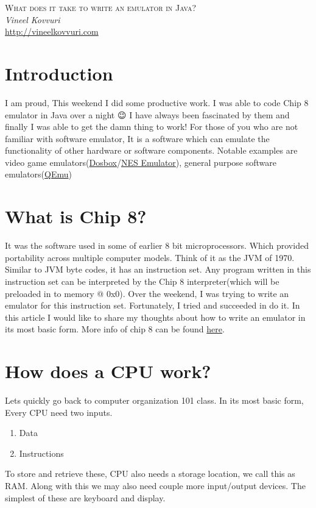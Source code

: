 \documentclass{article}
\begin{document}
\begin{titlepage}
   \begin{center}
      \Large\textsc{What does it take to write an emulator in Java?}\\
      \vspace{5mm}
      \Large\textit{Vineel Kovvuri}\\
      \url{http://vineelkovvuri.com}\\
   \end{center}
\end{titlepage}

\tableofcontents

\newpage
\section{Introduction}
I am proud, This weekend I did some productive work. I was able to code Chip 8 emulator in Java over a night 😉 I have always been fascinated by them and finally I was able to get the damn thing to work! For those of you who are not familiar with software emulator, It is a software which can emulate the functionality of other hardware or software components. Notable examples are video game emulators(\href{https://en.wikipedia.org/wiki/DOSBox}{Dosbox}/\href{https://en.wikipedia.org/wiki/List_of_video_game_emulators}{NES Emulator}), general purpose software emulators(\href{https://en.wikipedia.org/wiki/QEMU}{QEmu})

\section{What is Chip 8?}
It was the software used in some of earlier 8 bit microprocessors. Which provided portability across multiple computer models. Think of it as the JVM of 1970. Similar to JVM byte codes, it has an instruction set. Any program written in this instruction set can be interpreted by the Chip 8 interpreter(which will be preloaded in to memory @ 0x0). Over the weekend, I was trying to write an emulator for this instruction set. Fortunately, I tried and succeeded in do it. In this article I would like to share my thoughts about how to write an emulator in its most basic form. More info of chip 8 can be found \href{https://en.wikipedia.org/wiki/CHIP-8}{here}.

\section{How does a CPU work?}
Lets quickly go back to computer organization 101 class. In its most basic form, Every CPU need two inputs.
\begin{enumerate}[noitemsep]
\item Data
\item Instructions
\end{enumerate}
To store and retrieve these, CPU also needs a storage location, we call this as RAM.  Along with this we may also need couple more input/output devices. The simplest of these are keyboard and display.
\end{document}
